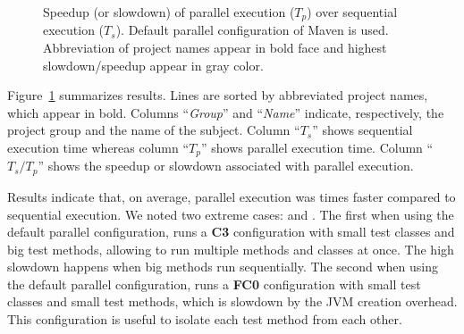 \begin{figure}[h!]
\centering
{}
\caption{Speedup (or slowdown) of parallel execution ($T_p$) over
  sequential execution ($T_s$).  Default parallel configuration of
  Maven is used.  Abbreviation of project names appear in bold face
  and highest slowdown/speedup appear in gray color.}
\label{tab:speedup}
\end{figure}

Figure~\ref{tab:speedup} summarizes results.  Lines are sorted by
abbreviated project names, which appear in bold.  Columns
``\emph{Group}'' and ``\emph{Name}'' indicate, respectively, the
project group and the name of the subject.  Column ``$T_s$'' shows
sequential execution time whereas column ``$T_p$'' shows parallel
execution time. Column ``$T_s/T_p$'' shows the speedup or slowdown
associated with parallel execution.

Results indicate that, on average, parallel execution was
\avgSpeedup{} times faster compared to sequential execution.  We noted
two extreme cases:  and .
The first when using the default parallel configuration, runs a
\textbf{C3} configuration with small test classes and big test
methods, allowing to run multiple methods and classes at once. The
high slowdown happens when big methods run sequentially.
The second when using the default parallel configuration, runs a
\textbf{FC0} configuration with small test classes and small test
methods, which is slowdown by the JVM creation overhead. This
configuration is useful to isolate each test method from each other.
 

